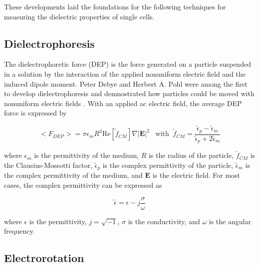  
 \par These developments laid the foundations for the following techniques for measuring the dielectric properties of single cells. 
 
 \subsection{Dielectrophoresis}
 \par The dielectrophoretic force (DEP) is the force generated on a particle suspended in a solution by the interaction of the applied nonuniform electric field and the induced dipole moment. Peter Debye and Herbert A. Pohl were among the first to develop dielectrophoresis and demnostrated how particles could be moved with nonuniform electric fields \cite{muller_potential_2003}. With an applied ac electric field, the average DEP force is expressed by \cite{morgan_single_2007, green_dielectrophoresis_1999}
 
 \begin{equation}
     \big< F_{DEP} \big> = \pi \epsilon_m R^3 \text{Re}[\tilde{f}_{CM}] \nabla |\textbf{E}|^2 \;\;\; \text{with} \;\;  \tilde{f}_{CM} = \frac{\tilde{\epsilon}_p - \tilde{\epsilon}_m}{\tilde{\epsilon}_p + 2\tilde{\epsilon}_m} 
 \end{equation}
 
 \noindent where $\epsilon_m$ is the permittivity of the medium, $R$ is the radius of the particle, $\tilde{f}_{CM}$ is the Clausius-Mossotti factor,  $\tilde{\epsilon}_p$ is the complex permittivity of the particle, $\tilde{\epsilon}_m$ is the complex permittivity of the medium, and $\textbf{E}$ is the electric field. For most cases, the complex permittivity can be expressed as 
 
 \begin{equation}
     \tilde{\epsilon} = \epsilon - j\frac{\sigma}{\omega}
 \end{equation}
 
\noindent where $\epsilon$ is the permittivity, $j = \sqrt{-1}$, $\sigma$ is the conductivity, and $\omega$ is the angular frequency. 
 
 \subsection{Electrorotation}
 
